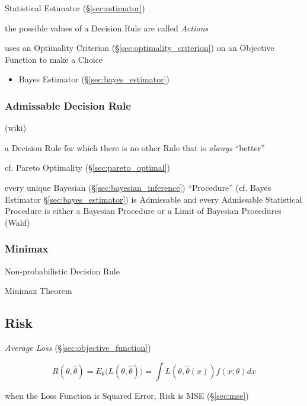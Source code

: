 \begin{itemize}
Statistical Estimator (\S\ref{sec:estimator})

the possible values of a Decision Rule are called \emph{Actions}

uses an Optimality Criterion (\S\ref{sec:optimality_criterion}) on an Objective
Function to make a Choice

\begin{itemize}
  \item Bayes Estimator (\S\ref{sec:bayes_estimator})
\end{itemize}



\subsubsection{Admissable Decision Rule}\label{sec:admissable_decision_rule}

(wiki)

a Decision Rule for which there is no other Rule that is \emph{always}
``better''

cf. Pareto Optimality (\S\ref{sec:pareto_optimal})

every unique Bayesian (\S\ref{sec:bayesian_inference}) ``Procedure'' (cf. Bayes
Estimator \S\ref{sec:bayes_estimator}) is Admissable and every Admissable
Statistical Procedure is either a Bayesian Procedure or a Limit of Bayesian
Procedures (Wald)



\subsubsection{Minimax}\label{sec:minimax}

Non-probabilistic Decision Rule

Minimax Theorem



\subsection{Risk}\label{sec:risk}

\emph{Average Loss} (\S\ref{sec:objective_function})

\[
  R(\theta,\hat{\theta}) = E_\theta\Big(L(\theta,\hat{\theta})\Big) =
    \int L(\theta,\hat{\theta}(x))f(x;\theta) dx
\]

when the Loss Function is Squared Error, Risk is MSE (\S\ref{sec:mse})




\end{itemize}

